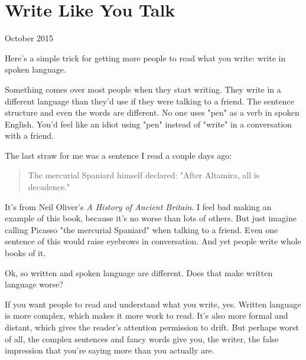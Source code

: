 \chapter{Write Like You Talk}


            
              
                

October 2015

Here's a simple trick for getting
                  more people to read what you write: write in spoken
                  language.

Something comes over most people when
                  they start writing. They write in a different language than
                  they'd use if they were talking to a friend. The sentence
                  structure and even the words are different. No one uses "pen"
                  as a verb in spoken English. You'd feel like an idiot using
                  "pen" instead of "write" in a conversation with a friend.

The
                  last straw for me was a sentence I read a couple days ago:
                  \begin{quote}

                    The mercurial Spaniard himself declared: "After Altamira,
                    all is decadence."
                  
\end{quote}

                  It's from Neil Oliver's \emph{A History of Ancient Britain}. I
                  feel bad making an example of this book, because it's no worse
                  than lots of others. But just imagine calling Picasso "the
                  mercurial Spaniard" when talking to a friend. Even one
                  sentence of this would raise eyebrows in conversation. And yet
                  people write whole books of it.

Ok, so written and
                  spoken language are different. Does that make written language
                  worse?

If you want people to read and understand
                  what you write, yes. Written language is more complex, which
                  makes it more work to read. It's also more formal and distant,
                  which gives the reader's attention permission to drift. But
                  perhaps worst of all, the complex sentences and fancy words
                  give you, the writer, the false impression that you're saying
                  more than you actually are.

